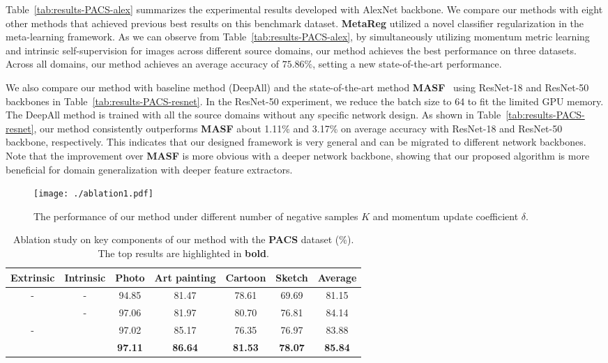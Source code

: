 Table~\ref{tab:results-PACS-alex} summarizes the experimental results developed with AlexNet backbone.
We compare our methods with eight other methods that achieved previous best results on this benchmark dataset.
\textbf{MetaReg} \cite{balaji2018metareg} utilized a novel classifier regularization in the meta-learning framework.
As we can observe from Table~\ref{tab:results-PACS-alex}, by simultaneously utilizing momentum metric learning and intrinsic self-supervision for images across different source domains, our method achieves the best performance on three datasets. 
Across all domains, our method achieves an average accuracy of $75.86\%$, setting a new state-of-the-art performance.

We also compare our method with baseline method (DeepAll) and the state-of-the-art method \textbf{MASF}~\cite{dou2019domain} using ResNet-18 and ResNet-50 backbones in  Table~\ref{tab:results-PACS-resnet}. 
In the ResNet-50 experiment, we reduce the batch size to 64 to fit the limited GPU memory.
The DeepAll method is trained with all the source domains without any specific network design.
As shown in Table~\ref{tab:results-PACS-resnet}, our method consistently outperforms \textbf{MASF} about 1.11\% and 3.17\% on average accuracy with ResNet-18 and ResNet-50 backbone, respectively.
This indicates that our designed framework is very general and can be migrated to different network backbones.
Note that the improvement over \textbf{MASF} is more obvious with a deeper network backbone, showing that our proposed algorithm is more beneficial for domain generalization with deeper feature extractors.

\begin{figure}[!t]
	\centering
	\texttt{[image: ./ablation1.pdf]}
	\caption{
		The performance of our method under different number of negative samples $K$ and momentum update coefficient $\delta$. 
}
	\label{fig:ablation1}
\end{figure}
\begin{table*} [!t]
	\centering
	\caption{Ablation study on key components of our method with the \textbf{PACS} dataset (\%). 
		The top results are highlighted in \textbf{bold}.}
	\label{tab:results-PACS-ablation}
{
		\setlength\tabcolsep{1.5pt}
		\begin{tabular}{cc|cccc|c}
			\toprule[1pt]
			\textbf{Extrinsic} & \textbf{Intrinsic}  & \textbf{P}hoto  & \textbf{A}rt painting &  \textbf{C}artoon &\textbf{S}ketch & \textbf{Average} \\
			\hline
			\T
			-&-&94.85&81.47&78.61&69.69& 81.15\\
			\checkmark &-&97.06&81.97&80.70&76.81&84.14 \\
			- &\checkmark&97.02&85.17&76.35&76.97&83.88 \\
			\checkmark     &\checkmark&\textbf{97.11}&\textbf{86.64}&\textbf{81.53}&\textbf{78.07}&\textbf{85.84} \\
			
			\toprule[1pt]
		\end{tabular}
	}
\end{table*}


